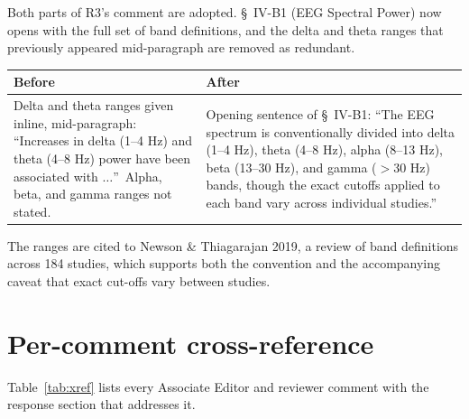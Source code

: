 \documentclass[11pt,a4paper]{article}
\makeatletter
\newcommand{\diffbox}[2]{%
  \begin{center}
  \small
  \begin{tabular}{@{}p{0.46\textwidth}@{\hspace{2em}}p{0.46\textwidth}@{}}
  \toprule
  \textbf{Before} & \textbf{After} \\
  \midrule
  #1 & #2 \\
  \bottomrule
  \end{tabular}
  \end{center}}
\makeatother
\begin{document}
Both parts of R3's comment are adopted. \S~IV-B1 (EEG Spectral Power) now opens with the full set of band definitions, and the delta and theta ranges that previously appeared mid-paragraph are removed as redundant.

\diffbox{Delta and theta ranges given inline, mid-paragraph: ``Increases in delta (1--4 Hz) and theta (4--8 Hz) power have been associated with $\ldots$''\ Alpha, beta, and gamma ranges not stated.}{Opening sentence of \S~IV-B1: ``The EEG spectrum is conventionally divided into delta (1--4 Hz), theta (4--8 Hz), alpha (8--13 Hz), beta (13--30 Hz), and gamma ($>$30 Hz) bands, though the exact cutoffs applied to each band vary across individual studies.''}

\noindent The ranges are cited to Newson \& Thiagarajan 2019, a review of band definitions across 184 studies, which supports both the convention and the accompanying caveat that exact cut-offs vary between studies.

\section{Per-comment cross-reference}\label{sec:xref}

Table~\ref{tab:xref} lists every Associate Editor and reviewer comment with the response section that addresses it.
\end{document}
